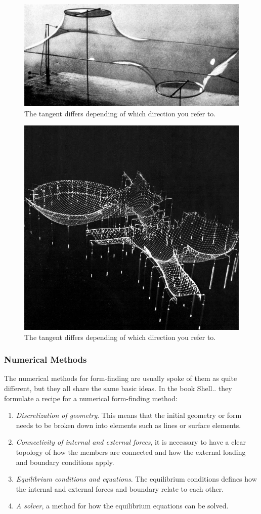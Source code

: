 \begin{figure}[H]
\centering
\includegraphics[width=0.6\linewidth ]{figure/Theory/Soap.jpg}
\caption{The tangent differs depending of which direction you refer to. }
\end{figure}

\begin{figure}[H]
\centering
\includegraphics[width=0.6\linewidth ]{figure/Theory/Multihalle.jpg}
\caption{The tangent differs depending of which direction you refer to. }
\end{figure}



\subsubsection{Numerical Methods} \label{numerical Methods}

The numerical methods for form-finding are usually spoke of them as quite different, but they all share the same basic ideas. In the book Shell.. they formulate a recipe for a numerical form-finding method:\\

\begin{enumerate}
    \item \textit{Discretization of geometry}. This means that the initial geometry or form needs to be broken down into elements such as lines or surface elements.
    \item \textit{Connectivity of internal and external forces}, it is necessary to have a clear topology of how the members are connected and how the external loading and boundary conditions apply.
    \item \textit{Equilibrium conditions and equations}. The equilibrium conditions defines how the internal and external forces and boundary relate to each other. 
    \item \textit{A solver}, a method for how the equilibrium equations can be solved.
\end{enumerate}
\vspace{5mm}


